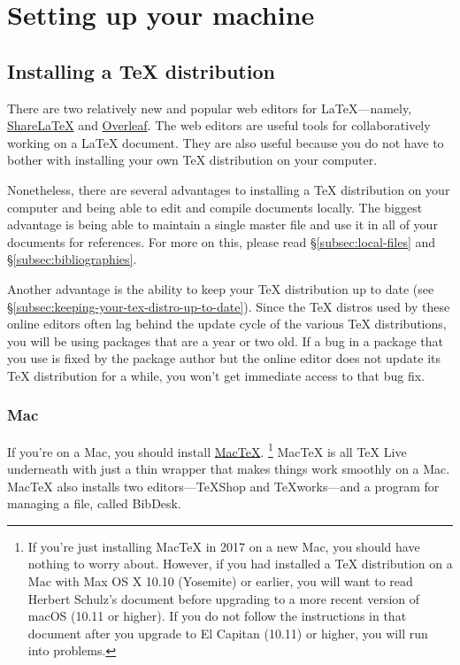 
\section{Setting up your machine}
\label{sec:setting-up-your-machine}

\subsection{Installing a \TeX{} distribution}
\label{subsec:installing-a-tex-distro}

There are two relatively new and popular web editors for \LaTeX---namely, \href{https://www.sharelatex.com/}{ShareLaTeX} and \href{https://www.overleaf.com/}{Overleaf}.
The web editors are useful tools for collaboratively working on a \LaTeX{} document.
They are also useful because you do not have to bother with installing your own \TeX{} distribution on your computer.

Nonetheless, there are several advantages to installing a \TeX{} distribution on your computer and being able to edit and compile  documents locally.
The biggest advantage is being able to maintain a single master  file and use it in all of your  documents for references.
For more on this, please read \S\ref{subsec:local-files} and \S\ref{subsec:bibliographies}.

Another advantage is the ability to keep your \TeX{} distribution up to date (see \S\ref{subsec:keeping-your-tex-distro-up-to-date}).
Since the \TeX{} distros used by these online editors often lag behind the update cycle of the various \TeX{} distributions, you will be using packages that are a year or two old.
If a bug in a package that you use is fixed by the package author but the online editor does not update its \TeX{} distribution for a while, you won't get immediate access to that bug fix.

\subsubsection{Mac}
\label{subsubsec:tex-distro:mac}

If you're on a Mac, you should install \href{https://tug.org/mactex/}{{Mac\TeX}}.%
\footnote{%
If you're just installing {Mac\TeX} in 2017 on a new Mac, you should have nothing to worry about.
However, if you had installed a \TeX{} distribution on a Mac with Max OS X 10.10 (Yosemite) or earlier, you will want to read Herbert Schulz's document \href{https://tug.org/mactex/UpdatingForElCapitan.pdf}{} before upgrading to a more recent version of macOS (10.11 or higher).
If you do not follow the instructions in that document after you upgrade to El Capitan (10.11) or higher, you will run into problems.%
}
{Mac\TeX} is all TeX Live underneath with just a thin wrapper that makes things work smoothly on a Mac.
{Mac\TeX} also installs two editors---TeXShop and TeXworks---and a program for managing a  file, called BibDesk.

